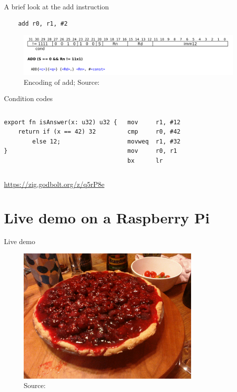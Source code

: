\documentclass{beamer}
\begin{document}
\begin{frame}[fragile]{A brief look at the add instruction}
    \begin{verbatim}
    add r0, r1, #2\end{verbatim}
    \begin{figure}
        \centering
        \includegraphics[width=\textwidth]{add.png}
        \caption{Encoding of add; Source: \cite{isa}}
        \label{fig:add}
    \end{figure}
\end{frame}

\begin{frame}[fragile]{Condition codes}
\begin{columns}
\begin{verbatim}
export fn isAnswer(x: u32) u32 {
    return if (x == 42) 32
        else 12;
}
\end{verbatim}

\begin{verbatim}
mov     r1, #12
cmp     r0, #42
movweq  r1, #32
mov     r0, r1
bx      lr
\end{verbatim}
\end{columns}

\vspace{1cm}

\url{https://zig.godbolt.org/z/q5rP8e}
\end{frame}

\section{Live demo on a Raspberry Pi}

\begin{frame}{Live demo}
    \begin{figure}
        \centering
        \includegraphics[width=0.8\textwidth]{Raspberry_pie.jpg}
        \caption{Source: \cite{rpie}}
        \label{fig:rpie}
    \end{figure}
\end{frame}
\end{document}
